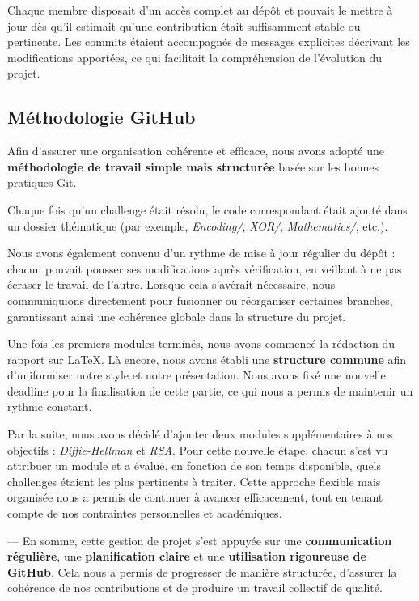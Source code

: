 Chaque membre disposait d’un accès complet au dépôt et pouvait le mettre à
jour dès qu’il estimait qu’une contribution était suffisamment stable ou
pertinente. Les commits étaient accompagnés de messages explicites
décrivant les modifications apportées, ce qui facilitait la compréhension
de l’évolution du projet.

\subsection{Méthodologie GitHub}
Afin d’assurer une organisation cohérente et efficace, nous avons adopté une
\textbf{méthodologie de travail simple mais structurée} basée sur les
bonnes pratiques Git.

Chaque fois qu’un challenge était résolu, le code correspondant était
ajouté dans un dossier thématique (par exemple, \textit{Encoding/},
\textit{XOR/}, \textit{Mathematics/}, etc.).

Nous avons également convenu d’un rythme de mise à jour régulier du dépôt :
chacun pouvait pousser ses modifications après vérification, en veillant à
ne pas écraser le travail de l’autre. Lorsque cela s’avérait nécessaire,
nous communiquions directement pour fusionner ou réorganiser certaines
branches, garantissant ainsi une cohérence globale dans la structure du
projet.

Une fois les premiers modules terminés, nous avons commencé la rédaction du
rapport sur \LaTeX{}. Là encore, nous avons établi une \textbf{structure
commune} afin d’uniformiser notre style et notre présentation. Nous avons
fixé une nouvelle deadline pour la finalisation de cette partie, ce qui
nous a permis de maintenir un rythme constant.

Par la suite, nous avons décidé d’ajouter deux modules supplémentaires à nos
objectifs : \textit{Diffie-Hellman} et \textit{RSA}. Pour cette nouvelle
étape, chacun s’est vu attribuer un module et a évalué, en fonction de son
temps disponible, quels challenges étaient les plus pertinents à traiter.
Cette approche flexible mais organisée nous a permis de continuer à avancer
efficacement, tout en tenant compte de nos contraintes personnelles et
académiques.

---
En somme, cette gestion de projet s’est appuyée sur une
\textbf{communication régulière}, une \textbf{planification claire} et une
\textbf{utilisation rigoureuse de GitHub}. Cela nous a permis de progresser
de manière structurée, d’assurer la cohérence de nos contributions et de
produire un travail collectif de qualité.